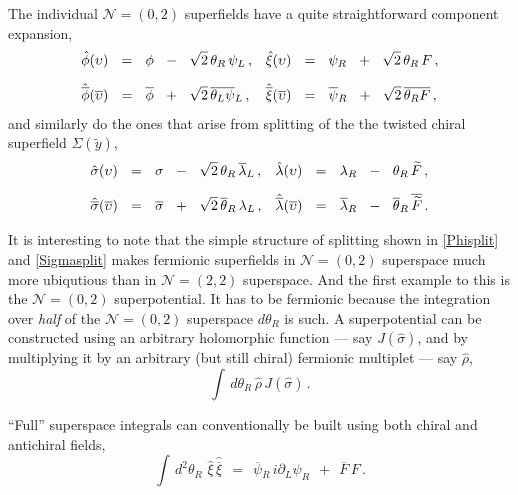 \documentclass[epsfig,12pt]{article}
\def\beq{\begin{equation}}
\def\eeq{\end{equation}}
\newcommand{\ntwot}{${\mathcal N}= \left(2,2\right) $ }
\newcommand{\ntwoo}{${\mathcal N}= \left(0,2\right) $ }
\newcommand{\p}{\partial}
\newcommand{\wt}{\widetilde}
\newcommand{\ov}{\overline}
\newcommand{\hphi}{\hat\phi{}}
\newcommand{\hbphi}{\hat{\ov\phi}{}}
\newcommand{\hxi}{\hat\xi{}}
\newcommand{\hbxi}{\hat{\ov\xi}{}}
\newcommand{\hsigma}{\hat\sigma{}}
\newcommand{\hbsigma}{\hat{\ov\sigma}{}}
\newcommand{\hlambda}{\hat\lambda{}}
\newcommand{\hblambda}{\hat{\ov\lambda}{}}
\begin{document}
	The individual \ntwoo superfields have a quite straightforward component expansion,
\begin{align}
%
\notag
	\hphi(\upsilon) &    ~~=~~    \phi  ~~-~~  \sqrt{2}\,\theta_R\,\psi_L\,,
	&
	\hxi(\upsilon) &    ~~=~~    \psi_R  ~~+~~  \sqrt{2}\,\theta_R\,F\,,
	\\[2mm]
%
	\hbphi(\ov\upsilon) &    ~~=~~    \ov \phi  ~~+~~  \sqrt{2}\,\ov{\theta_L \psi}{}_L\,,
	&
	\hbxi(\ov\upsilon) &    ~~=~~    \ov\psi{}_R  ~~+~~  \sqrt{2}\,\ov{\theta_R F}\,,
\end{align}
	and similarly do the ones that arise from splitting of the the twisted chiral superfield $ \Sigma(\wt y) $, 
\begin{align}
%
\notag
	\hsigma(\upsilon) &    ~~=~~    \sigma  ~~-~~  \sqrt{2}\,\theta_R\,\ov\lambda{}_L\,,
	&
	\hlambda(\upsilon) &    ~~=~~    \lambda_R  ~~-~~  \theta_R\,\wt F\,,
	\\[2mm]
%
	\hbsigma(\ov\upsilon) &    ~~=~~    \ov\sigma  ~~+~~  \sqrt{2}\,\ov\theta{}_R\,\lambda_L\,,
	&
	\hblambda(\ov\upsilon) &    ~~=~~    \ov\lambda{}_R  ~~-~~  \ov\theta{}_R\,\ov{\wt F}\,.
\end{align}

	
	It is interesting to note that the simple structure of splitting shown in \eqref{Phisplit} and \eqref{Sigmasplit}
	makes fermionic superfields in \ntwoo superspace much more ubiqutious than in \ntwot superspace.
	And the first example to this is the \ntwoo superpotential.
	It has to be fermionic because the integration over {\it half} of the \ntwoo superspace $ d\theta_R $ is such.
	A superpotential can be constructed using an arbitrary holomorphic function --- say $ J(\hsigma) $, and
	by multiplying it by an arbitrary (but still chiral) fermionic multiplet --- say $ \hat{\rho} $,
\beq
	\int\, d\theta_R\, \hat{\rho}\, J(\hsigma)\,.
\eeq

	``Full'' superspace integrals can conventionally be built using both chiral and antichiral fields,
\beq
	\int\, d^2\theta_R\,\, \hxi\, \hbxi    ~~=~~    \ov\psi{}_R\,i\p_L \psi_R  ~~+~~  \ov F\,F\,.
\eeq



\end{document}
